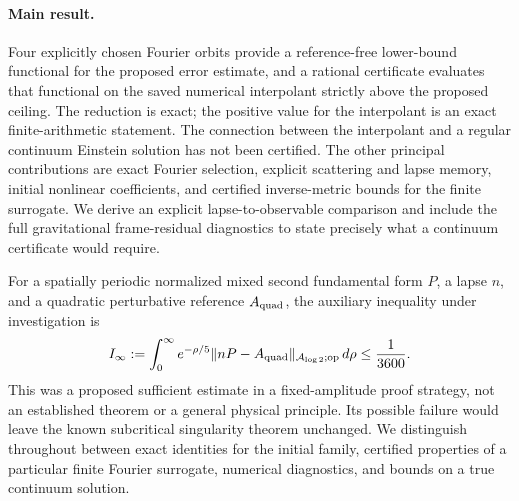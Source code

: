 \documentclass[11pt,a4paper]{article}
\theoremstyle{remark}
\newcommand{\A}{\mathcal A_{\log 2}}
\newcommand{\op}{\mathrm{op}}
\begin{document}
\paragraph{Main result.} Four explicitly chosen Fourier orbits provide a reference-free lower-bound functional for the proposed error estimate, and a rational certificate evaluates that functional on the saved numerical interpolant strictly above the proposed ceiling. The reduction is exact; the positive value for the interpolant is an exact finite-arithmetic statement. The connection between the interpolant and a regular continuum Einstein solution has not been certified. The other principal contributions are exact Fourier selection, explicit scattering and lapse memory, initial nonlinear coefficients, and certified inverse-metric bounds for the finite surrogate. We derive an explicit lapse-to-observable comparison and include the full gravitational frame-residual diagnostics to state precisely what a continuum certificate would require.

For a spatially periodic normalized mixed second fundamental form $P$, a lapse $n$, and a quadratic perturbative reference $A_{\rm quad}$, the auxiliary inequality under investigation is
\begin{equation}\label{eq:global}
I_\infty:=\int_0^\infty e^{-\rho/5}
\|nP-A_{\rm quad}\|_{\A;\op}\,d\rho\le\frac1{3600}.
\end{equation}
This was a proposed sufficient estimate in a fixed-amplitude proof strategy, not an established theorem or a general physical principle. Its possible failure would leave the known subcritical singularity theorem unchanged. We distinguish throughout between exact identities for the initial family, certified properties of a particular finite Fourier surrogate, numerical diagnostics, and bounds on a true continuum solution.
\end{document}
